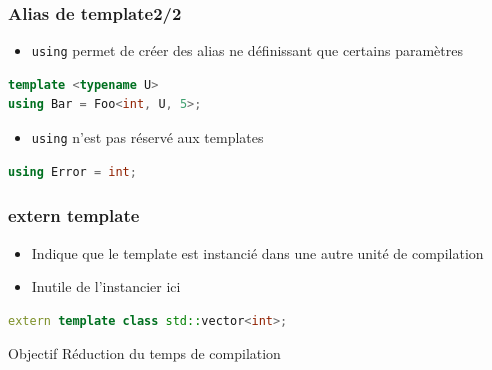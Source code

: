 \documentclass[C++.tex]{subfiles}
\begin{document}
\begin{frame}[fragile]
	\frametitle{Alias de template\titlehfill{}2/2}
	\begin{itemize}
		\item \lstinline|using| permet de créer des alias ne définissant que certains paramètres
	\end{itemize}

	\begin{lstlisting}[language=C++]
template <typename U>
using Bar = Foo<int, U, 5>;\end{lstlisting}

	\pause

	\begin{itemize}
		\item \lstinline|using| n'est pas réservé aux templates
	\end{itemize}


	\begin{lstlisting}[language=C++]
using Error = int;\end{lstlisting}
\end{frame}

\begin{frame}[fragile]
	\frametitle{extern template}
	\begin{itemize}
		\item Indique que le template est instancié dans une autre unité de compilation
		\item Inutile de l'instancier ici
	\end{itemize}

	\begin{lstlisting}[language=C++]
extern template class std::vector<int>;\end{lstlisting}

	\begin{block}{Objectif}
		Réduction du temps de compilation
	\end{block}
\end{frame}
\end{document}
